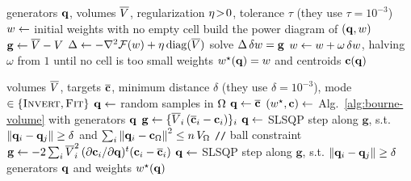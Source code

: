 \documentclass[main.tex]{subfiles}
\begin{document}
\begin{algorithm}[H]
  \caption{Volume solve of \citet{Bourne2025Inverting}, used by Algorithms~\ref{alg:bourne2025}--\ref{alg:bourne2026-fw}.}
  \label{alg:bourne-volume}
  \begin{algorithmic}[1]
    \Require generators $\mathbf{q}$, volumes $\overline{V}$, regularization $\eta \!>\! 0$, tolerance $\tau$ (they use $\tau \!=\! 10^{-3}$)
    \State $w \gets$ initial weights with no empty cell
    \Repeat
      \State build the power diagram of $(\mathbf{q}, w)$ \Comment{\eqref{eq:power-cell}}
      \State $\mathbf{g} \gets \overline{V} - V$ \Comment{\eqref{eq:volume-dual-gradient}}
      \State $\Delta \gets -\nabla^2\mathcal{F}(w) + \eta\,\mathrm{diag}(\overline{V})$ \Comment{\eqref{eq:newton-step}}
      \State solve $\Delta\,\delta w = \mathbf{g}$
      \State $w \gets w + \omega\,\delta w$, halving $\omega$ from $1$ until no cell is too small
    \State \Return weights $w^\star(\mathbf{q}) = w$ and centroids $\mathbf{c}(\mathbf{q})$
  \end{algorithmic}
\end{algorithm}

\begin{algorithm}[H]
  \caption{Inversion and fitting by \citet{Bourne2025Inverting}.}
  \label{alg:bourne2025}
  \begin{algorithmic}[1]
    \Require volumes $\overline{V}$, targets $\overline{\mathbf{c}}$, minimum distance $\delta$ (they use $\delta \!=\! 10^{-3}$), mode $\in \{\textsc{Invert}, \textsc{Fit}\}$
      \State $\mathbf{q} \gets$ random samples in $\Omega$
    \Else
      \State $\mathbf{q} \gets \overline{\mathbf{c}}$ 
    \EndIf
    \Repeat {}
      \State $(w^\star, \mathbf{c}) \gets$ Alg.~\ref{alg:bourne-volume} with generators $\mathbf{q}$
        \State $\mathbf{g} \gets \{\overline{V}_i\,(\overline{\mathbf{c}}_i - \mathbf{c}_i)\}_i$ 
        \State $\mathbf{q} \gets$ SLSQP step along $\mathbf{g}$, s.t. $\left\lVert \mathbf{q}_i - \mathbf{q}_j \right\rVert \ge \delta$
        \Statex \hspace{4.5em} and $\sum_i \left\lVert \mathbf{q}_i - \mathbf{c}_{\Omega} \right\rVert^2 \le n\,V_{\Omega}$ \hfill \texttt{//} ball constraint
      \Else
        \State $\mathbf{g} \gets -2 \sum_i \overline{V}_i^2\,(\partial\mathbf{c}_i / \partial\mathbf{q})^{t} (\mathbf{c}_i - \overline{\mathbf{c}}_i)$ 
        \State $\mathbf{q} \gets$ SLSQP step along $\mathbf{g}$, s.t. $\left\lVert \mathbf{q}_i - \mathbf{q}_j \right\rVert \ge \delta$
      \EndIf
    \State \Return generators $\mathbf{q}$ and weights $w^\star(\mathbf{q})$
  \end{algorithmic}
\end{algorithm}
\end{document}
